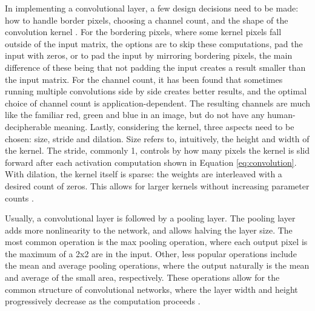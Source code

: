 \documentclass{article}
\begin{document}
In implementing a convolutional layer, a few design decisions need to be made: how to handle border 
pixels, choosing a channel count, and the shape of the convolution kernel \cite{princebook}.
For the bordering pixels, where some kernel pixels fall outside of the 
input matrix, the options are to skip these computations, pad the input with zeros, or to pad the input 
by mirroring bordering pixels, the main difference of these being that not padding the input creates a 
result smaller than the input matrix. For the channel count, it has been found that sometimes 
running multiple convolutions side by side creates better results, and the optimal choice of channel count is 
application-dependent. The resulting channels are much like the familiar red, green and blue in an image, but do not 
have any human-decipherable meaning. Lastly, considering the kernel, three aspects need to be chosen: size, stride and dilation.
Size refers to, intuitively, the height and width of the kernel. The stride, commonly 1, controls by how many pixels the 
kernel is slid forward after each activation computation shown in Equation \ref{eq:convolution}. With dilation, the kernel itself 
is sparse: the weights are interleaved with a desired count of zeros. This allows for larger kernels without increasing parameter counts \cite{princebook}.

Usually, a convolutional layer is followed by a pooling layer. The pooling layer adds more nonlinearity to the network, 
and allows halving the layer size. The most common operation is the max pooling operation, where each output pixel is the maximum of
a 2x2 are in the input. Other, less popular operations include the mean and average pooling operations, where the output naturally 
is the mean and average of the small area, respectively. These operations allow for the common structure of convolutional networks, 
where the layer width and height progressively decrease as the computation proceeds \cite{princebook}.
\end{document}
